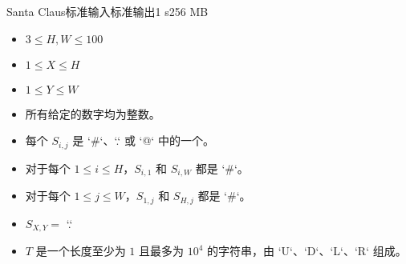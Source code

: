 \begin{problem}{Santa Claus}{标准输入}{标准输出}{1 s}{256 MB}
\Example

\begin{example}
\end{example}

\Constraints
\begin{itemize}
\item $3 \leq H,W \leq 100$
\item $1 \leq X \leq H$
\item $1 \leq Y \leq W$
\item 所有给定的数字均为整数。
\item 每个 $S_{i,j}$ 是 `\#`、`.` 或 `@` 中的一个。
\item 对于每个 $1 \leq i \leq H$，$S_{i,1}$ 和 $S_{i,W}$ 都是 `\#`。
\item 对于每个 $1 \leq j \leq W$，$S_{1,j}$ 和 $S_{H,j}$ 都是 `\#`。
\item $S_{X,Y}=$ `.`
\item $T$ 是一个长度至少为 $1$ 且最多为 $10^4$ 的字符串，由 `U`、`D`、`L`、`R` 组成。
\end{itemize}

\end{problem}
